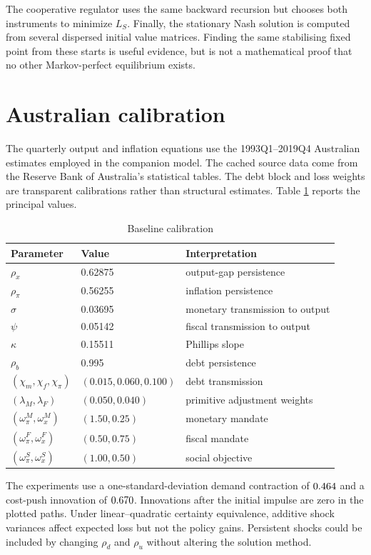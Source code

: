 \documentclass[11pt]{article}
\begin{document}
The cooperative regulator uses the same backward recursion but chooses both
instruments to minimize $L_S$.  Finally, the stationary Nash solution is
computed from several dispersed initial value matrices.  Finding the same
stabilising fixed point from these starts is useful evidence, but is not a
mathematical proof that no other Markov-perfect equilibrium exists.

\section{Australian calibration}

The quarterly output and inflation equations use the 1993Q1--2019Q4
Australian estimates employed in the companion model.  The cached source data
come from the Reserve Bank of Australia's statistical tables.  The debt block
and loss weights are transparent calibrations rather than structural
estimates.  Table \ref{tab:calibration} reports the principal values.

\begin{table}[H]
\centering
\caption{Baseline calibration}
\label{tab:calibration}
\begin{tabular}{lll}
\toprule
Parameter & Value & Interpretation\\
\midrule
$\rho_x$ & 0.62875 & output-gap persistence\\
$\rho_\pi$ & 0.56255 & inflation persistence\\
$\sigma$ & 0.03695 & monetary transmission to output\\
$\psi$ & 0.05142 & fiscal transmission to output\\
$\kappa$ & 0.15511 & Phillips slope\\
$\rho_b$ & 0.995 & debt persistence\\
$(\chi_m,\chi_f,\chi_\pi)$ & $(0.015,0.060,0.100)$ & debt transmission\\
$(\lambda_M,\lambda_F)$ & $(0.050,0.040)$ & primitive adjustment weights\\
$(\omega^M_\pi,\omega^M_x)$ & $(1.50,0.25)$ & monetary mandate\\
$(\omega^F_\pi,\omega^F_x)$ & $(0.50,0.75)$ & fiscal mandate\\
$(\omega^S_\pi,\omega^S_x)$ & $(1.00,0.50)$ & social objective\\
\bottomrule
\end{tabular}
\end{table}

The experiments use a one-standard-deviation demand contraction of
$0.464$ and a cost-push innovation of $0.670$.  Innovations after the
initial impulse are zero in the plotted paths.  Under linear--quadratic
certainty equivalence, additive shock variances affect expected loss but not
the policy gains.  Persistent shocks could be included by changing $\rho_d$
and $\rho_u$ without altering the solution method.
\end{document}
